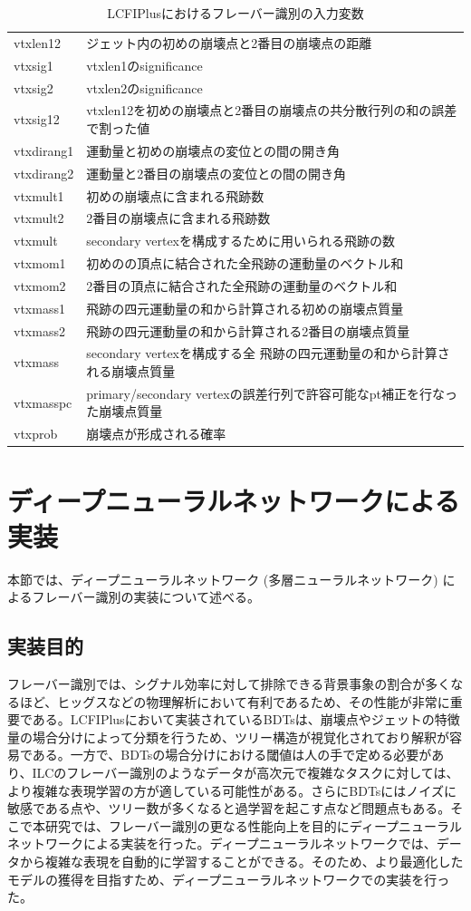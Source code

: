 \begin{table}[H]
\begin{tabular}{ l | l }
   vtxlen12 & ジェット内の初めの崩壊点と2番目の崩壊点の距離\\
   vtxsig1 & vtxlen1のsignificance\\
   vtxsig2 & vtxlen2のsignificance\\
   vtxsig12 & vtxlen12を初めの崩壊点と2番目の崩壊点の共分散行列の和の誤差で割った値\\
   vtxdirang1 & 運動量と初めの崩壊点の変位との間の開き角\\
   vtxdirang2 & 運動量と2番目の崩壊点の変位との間の開き角\\
   vtxmult1 & 初めの崩壊点に含まれる飛跡数\\
   vtxmult2 & 2番目の崩壊点に含まれる飛跡数\\
   vtxmult & secondary vertexを構成するために用いられる飛跡の数\\
   vtxmom1 & 初めのの頂点に結合された全飛跡の運動量のベクトル和\\
   vtxmom2 & 2番目の頂点に結合された全飛跡の運動量のベクトル和\\
   vtxmass1 & 飛跡の四元運動量の和から計算される初めの崩壊点質量\\
   vtxmass2 & 飛跡の四元運動量の和から計算される2番目の崩壊点質量\\
   vtxmass & secondary vertexを構成する全 飛跡の四元運動量の和から計算される崩壊点質量\\
   vtxmasspc & primary/secondary vertexの誤差行列で許容可能なpt補正を行なった崩壊点質量\\
   vtxprob & 崩壊点が形成される確率\\
   \hline
  \end{tabular}
  \caption{LCFIPlusにおけるフレーバー識別の入力変数}
 \label{lcfiplusin}
\end{table}
\section{ディープニューラルネットワークによる実装}
本節では、ディープニューラルネットワーク (多層ニューラルネットワーク) によるフレーバー識別の実装について述べる。
\subsection{実装目的}
フレーバー識別では、シグナル効率に対して排除できる背景事象の割合が多くなるほど、ヒッグスなどの物理解析において有利であるため、その性能が非常に重要である。LCFIPlusにおいて実装されているBDTsは、崩壊点やジェットの特徴量の場合分けによって分類を行うため、ツリー構造が視覚化されており解釈が容易である。一方で、BDTsの場合分けにおける閾値は人の手で定める必要があり、ILCのフレーバー識別のようなデータが高次元で複雑なタスクに対しては、より複雑な表現学習の方が適している可能性がある。さらにBDTsにはノイズに敏感である点や、ツリー数が多くなると過学習を起こす点など問題点もある。そこで本研究では、フレーバー識別の更なる性能向上を目的にディープニューラルネットワークによる実装を行った。ディープニューラルネットワークでは、データから複雑な表現を自動的に学習することができる。そのため、より最適化したモデルの獲得を目指すため、ディープニューラルネットワークでの実装を行った。

